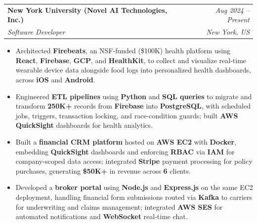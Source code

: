 \documentclass[10pt]{article}
\makeatletter
\newcommand{\resumeSubheading}[4]{
  \vspace{3pt}
  \begin{tabular*}{\textwidth}{@{}l@{\extracolsep{\fill}}r@{}}
    \textbf{#1} & \textit{#4} \\
    \textit{#3} & \textit{#2} \\
  \end{tabular*}\vspace{0pt}
}
\newcommand{\resumeItemListStart}{\begin{itemize}[leftmargin=12pt, itemsep=0.4pt, topsep=0.6pt, parsep=0pt]}
\newcommand{\resumeItemListEnd}{\end{itemize}\vspace{-1pt}}
\makeatother
\begin{document}
\resumeSubheading
{New York University (Novel AI Technologies, Inc.)}{New York, US}
{Software Developer}{Aug 2024 -- Present}
\resumeItemListStart
  \item \footnotesize{Architected \textbf{Firebeats}, an NSF-funded (\$100K) health platform using \textbf{React}, \textbf{Firebase}, \textbf{GCP}, and \textbf{HealthKit}, to collect and visualize real-time wearable device data alongside food logs into personalized health dashboards, across \textbf{iOS} and \textbf{Android}.}
  \item \footnotesize{Engineered \textbf{ETL pipelines} using \textbf{Python} and \textbf{SQL queries} to migrate and transform \textbf{250K+} records from \textbf{Firebase} into \textbf{PostgreSQL}, with scheduled jobs, triggers, transaction locking, and race-condition guards; built \textbf{AWS QuickSight} dashboards for health analytics.}
  \item \footnotesize{Built a \textbf{financial CRM platform} hosted on \textbf{AWS EC2} with \textbf{Docker}, embedding \textbf{QuickSight} dashboards and enforcing \textbf{RBAC} via \textbf{IAM} for company-scoped data access; integrated \textbf{Stripe} payment processing for policy purchases, generating \textbf{\$50K+} in revenue across \textbf{6} clients.}
  \item \footnotesize{Developed a \textbf{broker portal} using \textbf{Node.js} and \textbf{Express.js} on the same EC2 deployment, handling financial form submissions routed via \textbf{Kafka} to carriers for underwriting and claims management; integrated \textbf{AWS SES} for automated notifications and \textbf{WebSocket} real-time chat.}
\resumeItemListEnd
\vspace{3pt}
\end{document}
